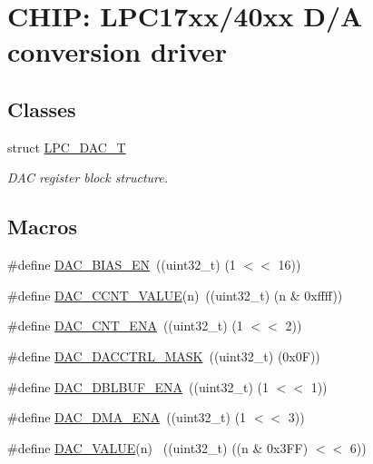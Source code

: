 \hypertarget{group__DAC__17XX__40XX}{}\section{C\+H\+IP\+: L\+P\+C17xx/40xx D/A conversion driver}
\label{group__DAC__17XX__40XX}
\subsection*{Classes}
\begin{DoxyCompactItemize}
\item 
struct \hyperlink{structLPC__DAC__T}{L\+P\+C\+\_\+\+D\+A\+C\+\_\+T}
\begin{DoxyCompactList}\small\item\em D\+AC register block structure. \end{DoxyCompactList}\end{DoxyCompactItemize}
\subsection*{Macros}
\begin{DoxyCompactItemize}
\item 
\#define \hyperlink{group__DAC__17XX__40XX_gabdfe0f0d61a206418a2ffdba26653873}{D\+A\+C\+\_\+\+B\+I\+A\+S\+\_\+\+EN}~((uint32\+\_\+t) (1 $<$$<$ 16))
\item 
\#define \hyperlink{group__DAC__17XX__40XX_ga23fecd9fa274c0f8387aad48330a0432}{D\+A\+C\+\_\+\+C\+C\+N\+T\+\_\+\+V\+A\+L\+UE}(n)~((uint32\+\_\+t) (n \& 0xffff))
\item 
\#define \hyperlink{group__DAC__17XX__40XX_gae7c63d487a239e6abaf2bfdced3c67e4}{D\+A\+C\+\_\+\+C\+N\+T\+\_\+\+E\+NA}~((uint32\+\_\+t) (1 $<$$<$ 2))
\item 
\#define \hyperlink{group__DAC__17XX__40XX_ga3d9ce4bc003bffdea6fb98da402d2318}{D\+A\+C\+\_\+\+D\+A\+C\+C\+T\+R\+L\+\_\+\+M\+A\+SK}~((uint32\+\_\+t) (0x0\+F))
\item 
\#define \hyperlink{group__DAC__17XX__40XX_gaa52ab08dc967f09afb7fcbb15ef1b1c0}{D\+A\+C\+\_\+\+D\+B\+L\+B\+U\+F\+\_\+\+E\+NA}~((uint32\+\_\+t) (1 $<$$<$ 1))
\item 
\#define \hyperlink{group__DAC__17XX__40XX_gab00cf8cef7eee4ff812d53ae52e4b38d}{D\+A\+C\+\_\+\+D\+M\+A\+\_\+\+E\+NA}~((uint32\+\_\+t) (1 $<$$<$ 3))
\item 
\#define \hyperlink{group__DAC__17XX__40XX_ga34dd1b81638106ca931a9c9e77daa699}{D\+A\+C\+\_\+\+V\+A\+L\+UE}(n)            ~((uint32\+\_\+t) ((n \& 0x3\+F\+F) $<$$<$ 6))
\end{DoxyCompactItemize}
